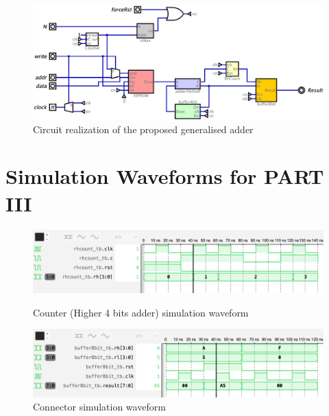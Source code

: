 \documentclass[11pt]{article}
\begin{document}
\begin{appendix}
\clearpage
\begin{figure}[h!]
	\centering
	\includegraphics[width=\textwidth]{main.png}
	\caption{Circuit realization of the proposed generalised adder}
	\label{fig:main}
\end{figure}


\section{Simulation Waveforms for PART III}
\label{app:b-2}

\begin{figure}[h!]
	\centering
	\begin{minipage}{0.45\textwidth}
		\centering
		\includegraphics[width=\textwidth]{RhCount_tb.png}
		\caption{Counter (Higher 4 bits adder) simulation waveform}
		\label{fig:RhCount_waveform}
	\end{minipage}
	\hfill
	\begin{minipage}{0.45\textwidth}
		\centering
		\includegraphics[width=\textwidth]{buffer8bit_tb.png}
		\caption{Connector simulation waveform}
		\label{fig:buffer8bit_waveform}
	\end{minipage}
\end{figure}


\end{appendix}
\end{document}

